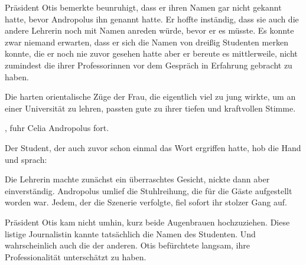 \par

Präsident Otis bemerkte beunruhigt, dass er ihren Namen gar nicht gekannt hatte, bevor Andropolus ihn genannt hatte. Er hoffte inständig, dass sie auch die andere Lehrerin noch mit Namen anreden würde, bevor er es müsste. Es konnte zwar niemand erwarten, dass er sich die Namen von dreißig Studenten merken konnte, die er noch nie zuvor gesehen hatte aber er bereute es mittlerweile, nicht zumindest die ihrer Professorinnen vor dem Gespräch in Erfahrung gebracht zu haben.

\par

Die harten orientalische Züge der Frau, die eigentlich viel zu jung wirkte, um an einer Universität zu lehren, passten gute zu ihrer tiefen und kraftvollen Stimme. 

\par

, fuhr Celia Andropolus fort. 

\par

Der Student, der auch zuvor schon einmal das Wort ergriffen hatte, hob die Hand und sprach: 

\par

Die Lehrerin machte zunächst ein überraschtes Gesicht, nickte dann aber einverständig. Andropolus umlief die Stuhlreihung, die für die Gäste aufgestellt worden war. Jedem, der die Szenerie verfolgte, fiel sofort ihr stolzer Gang auf. 

\par

Präsident Otis kam nicht umhin, kurz beide Augenbrauen hochzuziehen. Diese listige Journalistin kannte tatsächlich die Namen des Studenten. Und wahrscheinlich auch die der anderen. Otis befürchtete langsam, ihre Professionalität unterschätzt zu haben.

